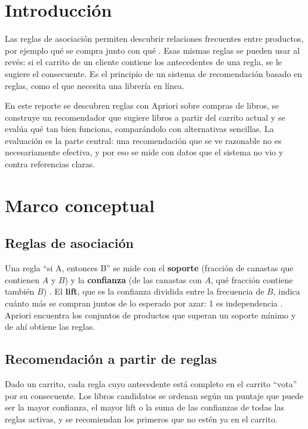 \documentclass[11pt,letterpaper]{article}
\begin{document}
\portada
\indicegeneral

\section{Introducción}

Las reglas de asociación permiten descubrir relaciones frecuentes entre productos, por ejemplo qué se compra junto con qué \parencite{iae_u4_t45}. Esas mismas reglas se pueden usar al revés: si el carrito de un cliente contiene los antecedentes de una regla, se le sugiere el consecuente. Es el principio de un sistema de recomendación basado en reglas, como el que necesita una librería en línea.

En este reporte se descubren reglas con Apriori sobre compras de libros, se construye un recomendador que sugiere libros a partir del carrito actual y se evalúa qué tan bien funciona, comparándolo con alternativas sencillas. La evaluación es la parte central: una recomendación que se ve razonable no es necesariamente efectiva, y por eso se mide con datos que el sistema no vio y contra referencias claras.

\section{Marco conceptual}

\subsection{Reglas de asociación}

Una regla ``si A, entonces B'' se mide con el \textbf{soporte} (fracción de canastas que contienen $A$ y $B$) y la \textbf{confianza} (de las canastas con $A$, qué fracción contiene también $B$) \parencite{iae_u4_t45}. El \textbf{lift}, que es la confianza dividida entre la frecuencia de $B$, indica cuánto más se compran juntos de lo esperado por azar: 1 es independencia \parencite{han2011}. Apriori encuentra los conjuntos de productos que superan un soporte mínimo y de ahí obtiene las reglas.

\subsection{Recomendación a partir de reglas}

Dado un carrito, cada regla cuyo antecedente está completo en el carrito ``vota'' por su consecuente. Los libros candidatos se ordenan según un puntaje que puede ser la mayor confianza, el mayor lift o la suma de las confianzas de todas las reglas activas, y se recomiendan los primeros que no estén ya en el carrito.
\end{document}
